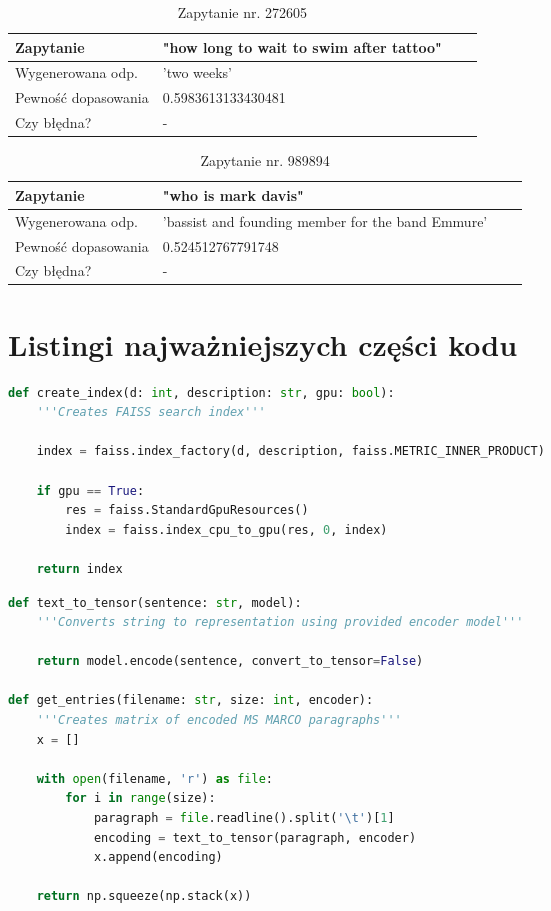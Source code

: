 \begin{table}[htp!]
\centering
\caption{Zapytanie nr. 272605}
\vspace*{5mm}
\begin{tabular}{llll}
   Zapytanie & "how long to wait to swim after tattoo"\\
   \hline
    Wygenerowana odp. & 'two weeks' \\
    \hline
    Pewność dopasowania & 0.5983613133430481\\
    \hline
    Czy błędna? & -\\
\end{tabular}
\end{table}

\begin{table}[htp!]
\centering
\caption{Zapytanie nr. 989894}
\vspace*{5mm}
\begin{tabular}{llll}
   Zapytanie & "who is mark davis"\\
   \hline
    Wygenerowana odp. & 'bassist and founding member for the band Emmure' \\
    \hline
    Pewność dopasowania & 0.524512767791748\\
    \hline
    Czy błędna? & -\\
\end{tabular}
\end{table}


\section{Listingi najważniejszych części kodu}

\begin{lstlisting}[language=Python, caption=Tworzenie indeksu] 
def create_index(d: int, description: str, gpu: bool):
    '''Creates FAISS search index'''

    index = faiss.index_factory(d, description, faiss.METRIC_INNER_PRODUCT)

    if gpu == True:
        res = faiss.StandardGpuResources()
        index = faiss.index_cpu_to_gpu(res, 0, index)

    return index
\end{lstlisting}

\begin{lstlisting}[language=Python, caption=Przetwarzanie zbioru danych]
def text_to_tensor(sentence: str, model):
    '''Converts string to representation using provided encoder model'''

    return model.encode(sentence, convert_to_tensor=False)

def get_entries(filename: str, size: int, encoder):
    '''Creates matrix of encoded MS MARCO paragraphs'''
    x = []

    with open(filename, 'r') as file:
        for i in range(size):
            paragraph = file.readline().split('\t')[1]
            encoding = text_to_tensor(paragraph, encoder)
            x.append(encoding)

    return np.squeeze(np.stack(x))
\end{lstlisting}

